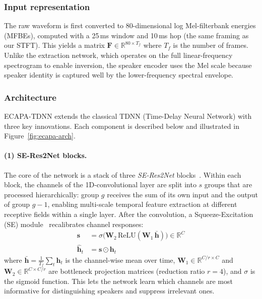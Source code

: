 \documentclass{article}
\begin{document}
\subsubsection{Input representation}
The raw waveform is first converted to 80-dimensional log Mel-filterbank energies (MFBEs), computed with a 25\,ms window and 10\,ms hop (the same framing as our STFT). This yields a matrix $\mathbf{F} \in \mathbb{R}^{80 \times T_f}$ where $T_f$ is the number of frames. Unlike the extraction network, which operates on the full linear-frequency spectrogram to enable inversion, the speaker encoder uses the Mel scale because speaker identity is captured well by the lower-frequency spectral envelope.

\subsubsection{Architecture}

ECAPA-TDNN extends the classical TDNN (Time-Delay Neural Network) with three key innovations. Each component is described below and illustrated in Figure~\ref{fig:ecapa-arch}.

\paragraph{(1) SE-Res2Net blocks.}
The core of the network is a stack of three \emph{SE-Res2Net} blocks~\citep{Res2Net}. Within each block, the channels of the 1D-convolutional layer are split into $s$ groups that are processed hierarchically: group $g$ receives the sum of its own input and the output of group $g{-}1$, enabling multi-scale temporal feature extraction at different receptive fields within a single layer. After the convolution, a Squeeze-Excitation (SE) module~\citep{SE} recalibrates channel responses:
\begin{align}
    \mathbf{s} &= \sigma\!\bigl(\mathbf{W}_2\, \text{ReLU}(\mathbf{W}_1\, \bar{\mathbf{h}})\bigr) \in \mathbb{R}^{C} \\
    \hat{\mathbf{h}}_t &= \mathbf{s} \odot \mathbf{h}_t
\end{align}
where $\bar{\mathbf{h}} = \frac{1}{T_f}\sum_t \mathbf{h}_t$ is the channel-wise mean over time, $\mathbf{W}_1 \in \mathbb{R}^{C/r \times C}$ and $\mathbf{W}_2 \in \mathbb{R}^{C \times C/r}$ are bottleneck projection matrices (reduction ratio $r = 4$), and $\sigma$ is the sigmoid function. This lets the network learn which channels are most informative for distinguishing speakers and suppress irrelevant ones.
\end{document}
